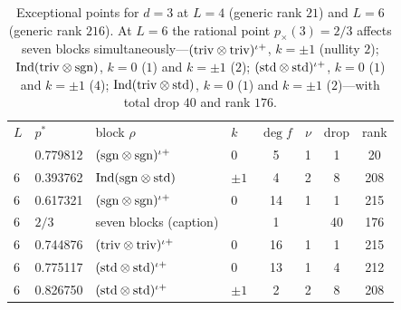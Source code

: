 \documentclass[aps,prx,reprint,superscriptaddress,nobibnotes,longbibliography]{revtex4-2}
\begin{document}
\begin{table}[h]
\caption{Exceptional points for $d=3$ at $L=4$ (generic rank $21$) and $L=6$ (generic rank $216$).  At $L=6$ the rational point $p_\times(3)=2/3$ affects seven blocks simultaneously---$({\rm triv}\otimes{\rm triv})^{\iota+}$, $k=\pm1$ (nullity $2$); ${\rm Ind}({\rm triv}\otimes{\rm sgn})$, $k=0$ ($1$) and $k=\pm1$ ($2$); $({\rm std}\otimes{\rm std})^{\iota+}$, $k=0$ ($1$) and $k=\pm1$ ($4$); ${\rm Ind}({\rm triv}\otimes{\rm std})$, $k=0$ ($1$) and $k=\pm1$ ($2$)---with total drop $40$ and rank $176$.}
\label{tab:S2}
\begin{ruledtabular}
\begin{tabular}{llllcccc}
$L$ & $p^*$ & block $\rho$ & $k$ & $\deg f$ & $\nu$ & drop & rank\\
\colrule
4 & 0.779812 & $({\rm sgn}\otimes{\rm sgn})^{\iota+}$ & $0$ & 5 & 1 & 1 & 20\\
6 & 0.393762 & ${\rm Ind}({\rm sgn}\otimes{\rm std})$ & $\pm1$ & 4 & 2 & 8 & 208\\
6 & 0.617321 & $({\rm sgn}\otimes{\rm sgn})^{\iota+}$ & $0$ & 14 & 1 & 1 & 215\\
6 & $2/3$ & seven blocks (caption) & & 1 & & 40 & 176\\
6 & 0.744876 & $({\rm triv}\otimes{\rm triv})^{\iota+}$ & $0$ & 16 & 1 & 1 & 215\\
6 & 0.775117 & $({\rm std}\otimes{\rm std})^{\iota+}$ & $0$ & 13 & 1 & 4 & 212\\
6 & 0.826750 & $({\rm std}\otimes{\rm std})^{\iota+}$ & $\pm1$ & 2 & 2 & 8 & 208\\
\end{tabular}
\end{ruledtabular}
\end{table}
\end{document}
